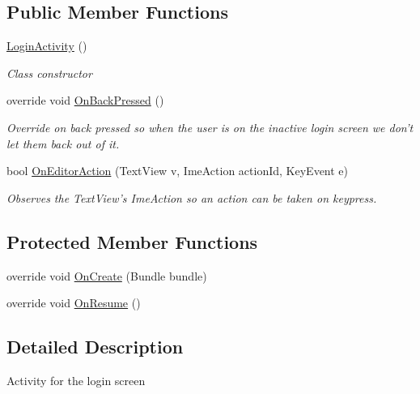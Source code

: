 \subsection*{Public Member Functions}
\begin{DoxyCompactItemize}
\item 
\hyperlink{class_field_service_1_1_android_1_1_login_activity_a5a818f2099d45646562bb40eaac97137}{Login\+Activity} ()
\begin{DoxyCompactList}\small\item\em Class constructor \end{DoxyCompactList}\item 
override void \hyperlink{class_field_service_1_1_android_1_1_login_activity_a72a4d438265211e2c8d8416725184d82}{On\+Back\+Pressed} ()
\begin{DoxyCompactList}\small\item\em Override on back pressed so when the user is on the inactive login screen we don't let them back out of it. \end{DoxyCompactList}\item 
bool \hyperlink{class_field_service_1_1_android_1_1_login_activity_a3e77df55b1e1d2c15f10399a971e01e3}{On\+Editor\+Action} (Text\+View v, Ime\+Action action\+Id, Key\+Event e)
\begin{DoxyCompactList}\small\item\em Observes the Text\+View's Ime\+Action so an action can be taken on keypress. \end{DoxyCompactList}\end{DoxyCompactItemize}
\subsection*{Protected Member Functions}
\begin{DoxyCompactItemize}
\item 
override void \hyperlink{class_field_service_1_1_android_1_1_login_activity_a94f530b97498de4c35ae74dba9b6f0aa}{On\+Create} (Bundle bundle)
\item 
override void \hyperlink{class_field_service_1_1_android_1_1_login_activity_a716f7942e4f0d5fe229d3a4a7611c029}{On\+Resume} ()
\end{DoxyCompactItemize}


\subsection{Detailed Description}
Activity for the login screen 



